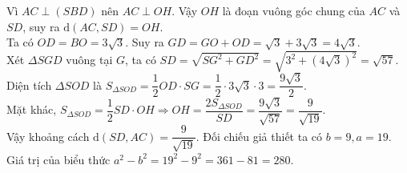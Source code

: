 \begin{ex}
{		Vì $AC\perp(SBD)$ nên $AC\perp OH$. Vậy $OH$ là đoạn vuông góc chung của $AC$ và $SD$, suy ra $\mathrm{d}(AC,SD)=OH$.\\
		Ta có $OD=BO=3\sqrt{3}$. Suy ra $GD=GO+OD=\sqrt{3}+3\sqrt{3}=4\sqrt{3}$.\\
		Xét $\Delta SGD$ vuông tại $G$, ta có $SD=\sqrt{SG^2+GD^2}=\sqrt{3^2+\left(4\sqrt{3}\right)^2}=\sqrt{57}$.\\
		Diện tích $\Delta SOD$ là $S_{\Delta SOD}=\dfrac{1}{2}OD\cdot SG=\dfrac{1}{2}\cdot3\sqrt{3}\cdot3=\dfrac{9\sqrt{3}}{2}$.\\
		Mặt khác, $S_{\Delta SOD}=\dfrac{1}{2}SD\cdot OH\Rightarrow OH=\dfrac{2S_{\Delta SOD}}{SD}=\dfrac{9\sqrt{3}}{\sqrt{57}}=\dfrac{9}{\sqrt{19}}$.\\
		Vậy khoảng cách $\mathrm{d}(SD,AC)=\dfrac{9}{\sqrt{19}}$. Đối chiếu giả thiết ta có $b=9,a=19$.\\
		Giá trị của biểu thức $a^2-b^2=19^2-9^2=361-81=280$.}
\end{ex}

